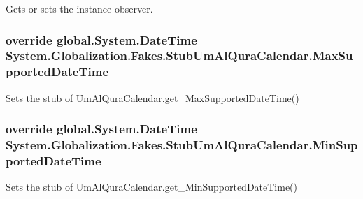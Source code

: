 Gets or sets the instance observer.

\hypertarget{class_system_1_1_globalization_1_1_fakes_1_1_stub_um_al_qura_calendar_a76f2ec3c0a011fef9a8ac3a62b618fdb}{
\subsubsection[{Max\-Supported\-Date\-Time}]{\setlength{\rightskip}{0pt plus 5cm}override global.\-System.\-Date\-Time System.\-Globalization.\-Fakes.\-Stub\-Um\-Al\-Qura\-Calendar.\-Max\-Supported\-Date\-Time\hspace{0.3cm}{\ttfamily [get]}}}\label{class_system_1_1_globalization_1_1_fakes_1_1_stub_um_al_qura_calendar_a76f2ec3c0a011fef9a8ac3a62b618fdb}


Sets the stub of Um\-Al\-Qura\-Calendar.\-get\-\_\-\-Max\-Supported\-Date\-Time()

\hypertarget{class_system_1_1_globalization_1_1_fakes_1_1_stub_um_al_qura_calendar_a20bfcffcfc19677868febe1686300041}{
\subsubsection[{Min\-Supported\-Date\-Time}]{\setlength{\rightskip}{0pt plus 5cm}override global.\-System.\-Date\-Time System.\-Globalization.\-Fakes.\-Stub\-Um\-Al\-Qura\-Calendar.\-Min\-Supported\-Date\-Time\hspace{0.3cm}{\ttfamily [get]}}}\label{class_system_1_1_globalization_1_1_fakes_1_1_stub_um_al_qura_calendar_a20bfcffcfc19677868febe1686300041}


Sets the stub of Um\-Al\-Qura\-Calendar.\-get\-\_\-\-Min\-Supported\-Date\-Time()

